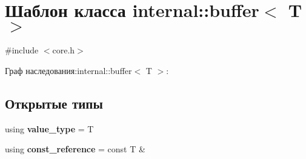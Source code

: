 \hypertarget{classinternal_1_1buffer}{}\section{Шаблон класса internal\+:\+:buffer$<$ T $>$}
\label{classinternal_1_1buffer}


{\ttfamily \#include $<$core.\+h$>$}



Граф наследования\+:internal\+:\+:buffer$<$ T $>$\+:
\subsection*{Открытые типы}
\begin{DoxyCompactItemize}
\item 
\mbox{\label{classinternal_1_1buffer_aef7ea32fdf476a2cf2284b5b831723f3}} 
using {\bfseries value\+\_\+type} = T
\item 
\mbox{\label{classinternal_1_1buffer_ab8967b7a8af5084a270cbcef93088705}} 
using {\bfseries const\+\_\+reference} = const T \&
\end{DoxyCompactItemize}
